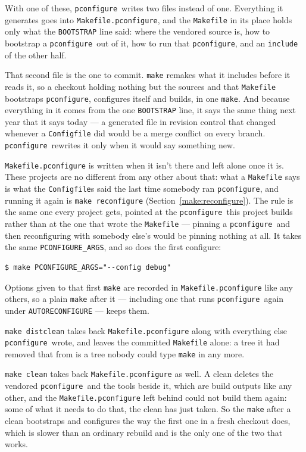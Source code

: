 \documentclass{article}
\newcommand{\pconfigure}{\texttt{pconfigure}}
\begin{document}
With one of these, \pconfigure\ writes two files instead of one.
Everything it generates goes into \texttt{Makefile.pconfigure}, and
the \texttt{Makefile} in its place holds only what the
\texttt{BOOTSTRAP} line said: where the vendored source is, how to
bootstrap a \pconfigure\ out of it, how to run that \pconfigure, and
an \texttt{include} of the other half.

That second file is the one to commit.  \texttt{make} remakes what it
includes before it reads it, so a checkout holding nothing but the
sources and that \texttt{Makefile} bootstraps \pconfigure, configures
itself and builds, in one \texttt{make}.  And because everything in it
comes from the one \texttt{BOOTSTRAP} line, it says the same thing
next year that it says today --- a generated file in revision control
that changed whenever a \texttt{Configfile} did would be a merge
conflict on every branch.  \pconfigure\ rewrites it only when it would
say something new.

\texttt{Makefile.pconfigure} is written when it isn't there and left
alone once it is.  These projects are no different from any other
about that: what a \texttt{Makefile} says is what the
\texttt{Configfile}s said the last time somebody ran \pconfigure, and
running it again is \texttt{make reconfigure}
(Section~\ref{make:reconfigure}).  The rule is the same one every
project gets, pointed at the \pconfigure\ this project builds rather
than at the one that wrote the \texttt{Makefile} --- pinning a
\pconfigure\ and then reconfiguring with somebody else's would be
pinning nothing at all.  It takes the same \texttt{PCONFIGURE\_ARGS},
and so does the first configure:

\begin{verbatim}
$ make PCONFIGURE_ARGS="--config debug"
\end{verbatim}

Options given to that first \texttt{make} are recorded in
\texttt{Makefile.pconfigure} like any others, so a plain \texttt{make}
after it --- including one that runs \pconfigure\ again under
\texttt{AUTORECONFIGURE} --- keeps them.

\texttt{make distclean} takes back \texttt{Makefile.pconfigure} along
with everything else \pconfigure\ wrote, and leaves the committed
\texttt{Makefile} alone: a tree it had removed that from is a tree
nobody could type \texttt{make} in any more.

\texttt{make clean} takes back \texttt{Makefile.pconfigure} as well.
A clean deletes the vendored \pconfigure\ and the tools beside it,
which are build outputs like any other, and the
\texttt{Makefile.pconfigure} left behind could not build them again:
some of what it needs to do that, the clean has just taken.  So the
\texttt{make} after a clean bootstraps and configures the way the first
one in a fresh checkout does, which is slower than an ordinary rebuild
and is the only one of the two that works.
\end{document}
